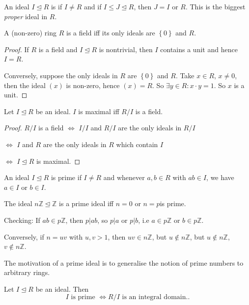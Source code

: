 \documentclass[egregdoesnotlikesansseriftitles,a4paper]{scrartcl}
\begin{document}
\begin{definition*}
       An ideal $I \unlhd R$ is  if $I \neq R$ and if $I \leq J \unlhd R$, then $J=I$ or $R$. This is the biggest \emph{proper} ideal in $R$.
\end{definition*}
\begin{lemma}
       A (non-zero) ring $R$ is a field iff its only ideals are $\left\{0\right\}$ and $R$.
\end{lemma}
\begin{proof}
      If $R$ is a field and $I \unlhd R$ is nontrivial, then $I$ contains a unit and hence $I=R$.

      Conversely, suppose the only ideals in $R$ are $\left\{0\right\}$ and $R$. Take $x \in R$, $x \neq 0$, then the ideal $(x)$ is non-zero, hence $(x)=R$. So $\exists y \in R: x \cdot y=1$. So $x$ is a unit. 
\end{proof}
\begin{proposition}\label{mideal1}
       Let $I \unlhd R$ be an ideal. $I$ is maximal iff $R/I$ is a field.
\end{proposition}
\begin{proof}
       $R/I$ is a field $\iff$ $I/I$ and $R/I$ are the only ideals in $R/I$ 
       
       $\iff$ $I$ and $R$ are the only ideals in $R$ which contain $I$
       
       $\iff$ $I \unlhd R$ is maximal.
\end{proof}
\begin{definition*}
       An ideal $I \unlhd R$ is prime if $I \neq R$ and whenever $a,b \in R$ with $ab \in I$, we have $a \in I$ or $b \in I$.
\end{definition*}
\begin{example*}
       The ideal $n\mathbb{Z} \unlhd \mathbb{Z}$ is a prime ideal iff $n=0$ or $n=p$is prime.

       Checking: If $ab\in p\mathbb{Z}$, then $p|ab$, so $p|a$ or $p|b$, i.e $a \in p\mathbb{Z}$ or $b \in p\mathbb{Z}$.

       Conversely, if $n=uv$ with $u,v >1$, then $uv \in n\mathbb{Z}$, but $u \notin n\mathbb{Z}$, but $u \notin n\mathbb{Z}$, $v \notin n\mathbb{Z}$.
       \begin{remark}
              The motivation of a prime ideal is to generalise the notion of prime numbers to arbitrary rings.
       \end{remark}
\end{example*}
\begin{proposition}\label{pideal1}
       Let $I \unlhd R$ be an ideal. Then \[
       I \text{ is prime } \iff R/I \text{ is an integral domain.} 
       .\] 
\end{proposition}
\end{document}
